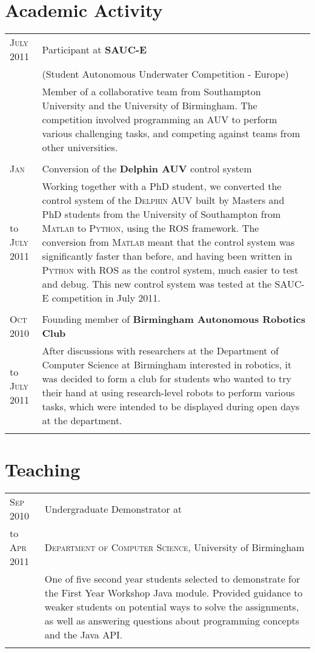\documentclass[a4paper,10pt]{article}
\begin{document}
\section{Academic Activity}
\begin{tabular}{l|p{11cm}}
  \textsc{July 2011}&Participant at \textbf{\textsc{SAUC-E}}\\
  & (Student Autonomous Underwater Competition - Europe)\\
  &\footnotesize{Member of a collaborative team from Southampton University and the University of Birmingham. The competition involved programming an AUV to perform various challenging tasks, and competing against teams from other universities.}\\\multicolumn{2}{c}{}\\
  \textsc{Jan}&Conversion of the \textbf{Delphin AUV} control system\\
  to \textsc{July 2011}&\footnotesize{Working together with a PhD student, we converted the control system of the \textsc{Delphin AUV} built by Masters and PhD students from the University of Southampton from \textsc{Matlab} to \textsc{Python}, using the \textsc{ROS} framework. The conversion from \textsc{Matlab} meant that the control system was significantly faster than before, and having been written in \textsc{Python} with \textsc{ROS} as the control system, much easier to test and debug. This new control system was tested at the \textsc{SAUC-E} competition in July 2011.}\\\multicolumn{2}{c}{}\\
  \textsc{Oct 2010}&Founding member of \textbf{Birmingham Autonomous Robotics Club}\\
  to \textsc{July 2011}&\footnotesize{After discussions with researchers at the Department of Computer Science at Birmingham interested in robotics, it was decided to form a club for students who wanted to try their hand at using research-level robots to perform various tasks, which were intended to be displayed during open days at the department.}\\\multicolumn{2}{c}{}\\
\end{tabular}

\section{Teaching}
\begin{tabular}{l|p{11cm}}
  \textsc{Sep 2010}& Undergraduate Demonstrator at \\
  to \textsc{Apr 2011}&\textsc{Department of Computer Science}, University of Birmingham\\
  &\footnotesize{One of five second year students selected to demonstrate for the First Year Workshop Java module. Provided guidance to weaker students on potential ways to solve the assignments, as well as answering questions about programming concepts and the Java API.}\\\multicolumn{2}{c}{} \\
\end{tabular}
\end{document}
